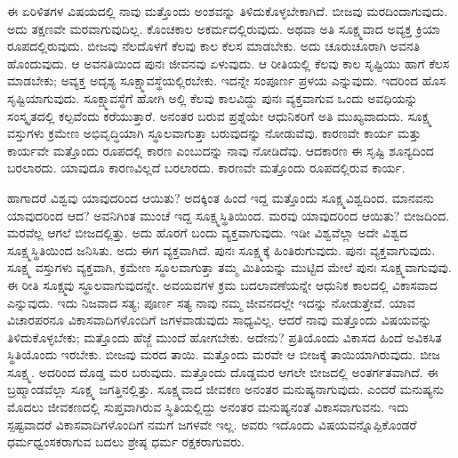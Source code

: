 \vskip 0.2cm

ಈ ಏರಿಳಿತಗಳ ವಿಷಯದಲ್ಲಿ ನಾವು ಮತ್ತೊಂದು ಅಂಶವನ್ನು ತಿಳಿದುಕೊಳ್ಳಬೇಕಾಗಿದೆ. ಬೀಜವು ಮರದಿಂದಾಗುವುದು. ಅದು ತಕ್ಷಣವೇ ಮರವಾಗುವುದಿಲ್ಲ. ಕೊಂಚಕಾಲ ಅಕರ್ಮದಲ್ಲಿರುವುದು. ಅಥವಾ ಅತಿ ಸೂಕ್ಷ್ಮವಾದ ಅವ್ಯಕ್ತ ಕ್ರಿಯಾ ರೂಪದಲ್ಲಿರುವುದು. ಬೀಜವು ನೆಲದೊಳಗೆ ಕೆಲವು ಕಾಲ ಕೆಲಸ ಮಾಡಬೇಕು. ಅದು ಚೂರುಚೂರಾಗಿ ಅವನತಿ ಹೊಂದುವುದು. ಆ ಅವನತಿಯಿಂದ ಪುನಃ ಜೀವನವು ಏಳುವುದು. ಆ ರೀತಿಯಲ್ಲಿ ಕೆಲವು ಕಾಲ ಸೃಷ್ಟಿಯು ಹಾಗೆ ಕೆಲಸ ಮಾಡಬೇಕು; ಅವ್ಯಕ್ತ ಅದೃಶ್ಯ ಸೂಕ್ಷ್ಮಾವಸ್ಥೆಯಲ್ಲಿರಬೇಕು. ಇದನ್ನೇ ಸಂಪೂರ್ಣ ಪ್ರಳಯ ಎನ್ನುವುದು. ಇದರಿಂದ ಹೊಸ ಸೃಷ್ಟಿಯಾಗುವುದು. ಸೂಕ್ಷ್ಮಾವಸ್ಥೆಗೆ ಹೋಗಿ ಅಲ್ಲಿ ಕೆಲವು ಕಾಲವಿದ್ದು ಪುನಃ ವ್ಯಕ್ತವಾಗುವ ಒಂದು ಅವಧಿಯನ್ನು ಸಂಸ್ಕೃತದಲ್ಲಿ ಕಲ್ಪವೆಂದು ಕರೆಯುತ್ತಾರೆ. ಅನಂತರ ಬರುವ ಪ್ರಶ್ನೆಯೇ ಆಧುನಿಕರಿಗೆ ಅತಿ ಮುಖ್ಯವಾದುದು. ಸೂಕ್ಷ್ಮ ವಸ್ತುಗಳು ಕ್ರಮೇಣ ಅಭಿವೃದ್ಧಿಯಾಗಿ ಸ್ಥೂಲವಾಗುತ್ತಾ ಬರುವುದನ್ನು ನೋಡುವೆವು. ಕಾರಣವೇ ಕಾರ್ಯ ಮತ್ತು ಕಾರ್ಯವೇ ಮತ್ತೊಂದು ರೂಪದಲ್ಲಿ ಕಾರಣ ಎಂಬುದನ್ನು ನಾವು ನೋಡಿದೆವು. ಆದಕಾರಣ ಈ ಸೃಷ್ಟಿ ಶೂನ್ಯದಿಂದ ಬರಲಾರದು. ಯಾವುದೂ ಕಾರಣವಿಲ್ಲದೆ ಬರಲಾರದು. ಕಾರಣವೇ ಮತ್ತೊಂದು ರೂಪದಲ್ಲಿರುವ ಕಾರ್ಯ.

\vskip 0.2cm

ಹಾಗಾದರೆ ವಿಶ್ವವು ಯಾವುದರಿಂದ ಆಯಿತು? ಅದಕ್ಕಿಂತ ಹಿಂದೆ ಇದ್ದ ಮತ್ತೊಂದು ಸೂಕ್ಷ್ಮವಿಶ್ವದಿಂದ. ಮಾನವನು ಯಾವುದರಿಂದ ಆದ? ಅವನಿಗಿಂತ ಮುಂಚೆ ಇದ್ದ ಸೂಕ್ಷ್ಮಸ್ಥಿತಿಯಿಂದ. ಮರವು ಯಾವುದರಿಂದ ಆಯಿತು? ಬೀಜದಿಂದ. ಮರವೆಲ್ಲ ಆಗಲೆ ಬೀಜದಲ್ಲಿತ್ತು. ಅದು ಹೊರಗೆ ಬಂದು ವ್ಯಕ್ತವಾಗುವುದು. ಇಡೀ ವಿಶ್ವವೆಲ್ಲಾ ಅದೇ ವಿಶ್ವದ ಸೂಕ್ಷ್ಮಸ್ಥಿತಿಯಿಂದ ಜನಿಸಿತು. ಅದು ಈಗ ವ್ಯಕ್ತವಾಗಿದೆ. ಪುನಃ ಸೂಕ್ಷ್ಮಕ್ಕೆ ಹಿಂತಿರುಗುವುದು. ಪುನಃ ವ್ಯಕ್ತವಾಗುವುದು. ಸೂಕ್ಷ್ಮ ವಸ್ತುಗಳು ವ್ಯಕ್ತವಾಗಿ, ಕ್ರಮೇಣ ಸ್ಥೂಲವಾಗುತ್ತಾ ತಮ್ಮ ಮಿತಿಯನ್ನು ಮುಟ್ಟಿದ ಮೇಲೆ ಪುನಃ ಸೂಕ್ಷ್ಮವಾಗುವುವು. ಈ ರೀತಿ ಸೂಕ್ಷ್ಮವು ಸ್ಥೂಲವಾಗುವುದನ್ನೇ. ಅವಯವಗಳ ಕ್ರಮ ಬದಲಾವಣೆಯನ್ನೇ ಆಧುನಿಕ ಕಾಲದಲ್ಲಿ ವಿಕಾಸವಾದ ಎನ್ನುವುದು. ಇದು ನಿಜವಾದ ಸತ್ಯ; ಪೂರ್ಣ ಸತ್ಯ ನಾವು ನಮ್ಮ ಜೀವನದಲ್ಲೇ ಇದನ್ನು ನೋಡುತ್ತೇವೆ. ಯಾವ ವಿಚಾರಪರನೂ ವಿಕಾಸವಾದಿಗಳೊಂದಿಗೆ ಜಗಳವಾಡುವುದು ಸಾಧ್ಯವಿಲ್ಲ. ಆದರೆ ನಾವು ಮತ್ತೊಂದು ವಿಷಯವನ್ನು ತಿಳಿದುಕೊಳ್ಳಬೇಕು; ಮತ್ತೊಂದು ಹೆಜ್ಜೆ ಮುಂದೆ ಹೋಗಬೇಕು. ಅದೇನು? ಪ್ರತಿಯೊಂದು ವಿಕಾಸದ ಹಿಂದೆ ಅವಿಕಸಿತ ಸ್ಥಿತಿಯೊಂದು ಇರಬೇಕು. ಬೀಜವು ಮರದ ತಾಯಿ. ಮತ್ತೊಂದು ಮರವೇ ಆ ಬೀಜಕ್ಕೆ ತಾಯಿಯಾಗಿರುವುದು. ಬೀಜ ಸೂಕ್ಷ್ಮ. ಅದರಿಂದ ದೊಡ್ಡ ಮರ ಬರುವುದು. ಮತ್ತೊಂದು ದೊಡ್ಡಮರ ಆಗಲೇ ಬೀಜದಲ್ಲಿ ಅಂತರ್ಗತವಾಗಿದೆ. ಈ ಬ್ರಹ್ಮಾಂಡವೆಲ್ಲಾ ಸೂಕ್ಷ್ಮ ಜಗತ್ತಿನಲ್ಲಿತ್ತು. ಸೂಕ್ಷ್ಮವಾದ ಜೀವಕಣ ಅನಂತರ ಮನುಷ್ಯನಾಗುವುದು. ಎಂದರೆ ಮನುಷ್ಯನು ಮೊದಲು ಜೀವಕಣದಲ್ಲಿ ಸುಪ್ತವಾಗಿರುವ ಸ್ಥಿತಿಯಲ್ಲಿದ್ದು ಅನಂತರ ಮನುಷ್ಯನಂತೆ ವಿಕಾಸವಾಗುವನು. ಇದು ಸ್ಪಷ್ಟವಾದರೆ ವಿಕಾಸವಾದಿಗಳೊಂದಿಗೆ ನಮಗೆ ಜಗಳವೇ ಇಲ್ಲ. ಅವರು ಇದೊಂದು ವಿಷಯವನ್ನೊಪ್ಪಿಕೊಂಡರೆ ಧರ್ಮಧ್ವಂಸಕರಾಗುವ ಬದಲು ಶ್ರೇಷ್ಠ ಧರ್ಮ ರಕ್ಷಕರಾಗುವರು.

\vskip 0.2cm

